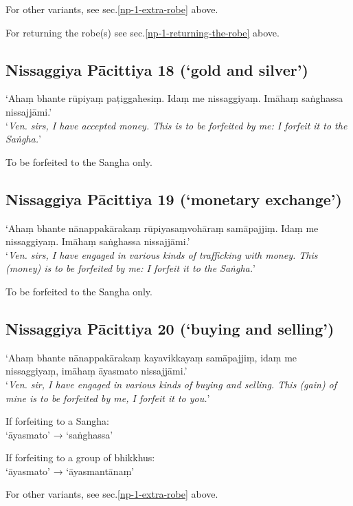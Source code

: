For other variants, see sec.\ref{np-1-extra-robe} above.

For returning the robe(s) see sec.\ref{np-1-returning-the-robe} above.

\subsection{Nissaggiya Pācittiya 18 (‘gold and silver’)}

‘Ahaṃ bhante rūpiyaṃ paṭiggahesiṃ. Idaṃ me nissaggiyaṃ. Imāhaṃ saṅghassa
nissajjāmi.’\\
‘\emph{Ven. sirs, I have accepted money. This is to be forfeited by me: I
  forfeit it to the Saṅgha.}’


To be forfeited to the Sangha only.

\subsection{Nissaggiya Pācittiya 19 (‘monetary exchange’)}

‘Ahaṃ bhante nānappakārakaṃ rūpiyasaṃvohāraṃ samāpajjiṃ. Idaṃ me nissaggiyaṃ.
Imāhaṃ saṅghassa nissajjāmi.’\\
‘\emph{Ven. sirs, I have engaged in various kinds of trafficking with money.
  This (money) is to be forfeited by me: I forfeit it to the Saṅgha.}’


To be forfeited to the Sangha only.

\subsection{Nissaggiya Pācittiya 20 (‘buying and selling’)}

‘Ahaṃ bhante nānappakārakaṃ kayavikkayaṃ samāpajjiṃ, idaṃ me nissaggiyaṃ, imāhaṃ
āyasmato nissajjāmi.’\\
‘\emph{Ven. sir, I have engaged in various kinds of buying and selling. This
  (gain) of mine is to be forfeited by me, I forfeit it to you.}’


If forfeiting to a Sangha:\\
‘āyasmato’ → ‘saṅghassa’

If forfeiting to a group of bhikkhus:\\
‘āyasmato’ → ‘āyasmantānaṃ’

For other variants, see sec.\ref{np-1-extra-robe} above.

